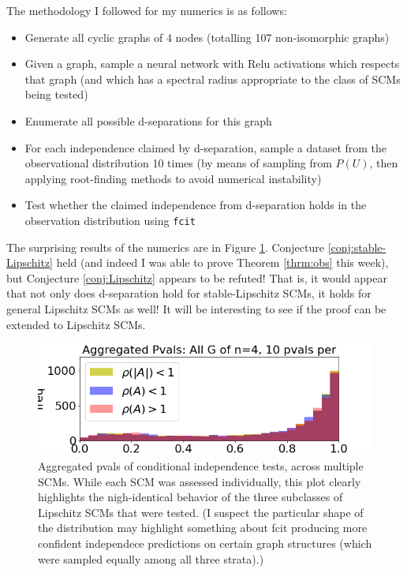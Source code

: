 \documentclass[letterpaper,10pt]{article}
\begin{document}
The methodology I followed for my numerics is as follows:
\begin{itemize}
  \item Generate all cyclic graphs of 4 nodes (totalling 107 non-isomorphic graphs)
  \item Given a graph, sample a neural network with Relu activations which respects that graph (and which has a spectral radius appropriate to the class of SCMs being tested)
  \item Enumerate all possible d-separations for this graph
  \item For each independence claimed by d-separation, sample a dataset from the observational distribution 10 times (by means of sampling from $P(U)$, then applying root-finding methods to avoid numerical instability)
  \item Test whether the claimed independence from d-separation holds in the observation distribution using \verb|fcit|
\end{itemize}

The surprising results of the numerics are in Figure \ref{fig:aggregated-plot}. Conjecture \ref{conj:stable-Lipschitz} held (and indeed I was able to prove Theorem \ref{thrm:obs} this week), but Conjecture \ref{conj:Lipschitz} appears to be refuted! That is, it would appear that not only does d-separation hold for stable-Lipschitz SCMs, it holds for general Lipschitz SCMs as well! It will be interesting to see if the proof can be extended to Lipschitz SCMs.

\begin{figure}
\centering
\includegraphics[width=.7\linewidth]{pics/my_own/aggregated_plot.png}
\caption{Aggregated pvals of conditional independence tests, across multiple SCMs. While each SCM was assessed individually, this plot clearly highlights the nigh-identical behavior of the three subclasses of Lipschitz SCMs that were tested. (I suspect the particular shape of the distribution may highlight something about fcit producing more confident independece predictions on certain graph structures (which were sampled equally among all three strata).)}
\label{fig:aggregated-plot}
\end{figure}
\end{document}
